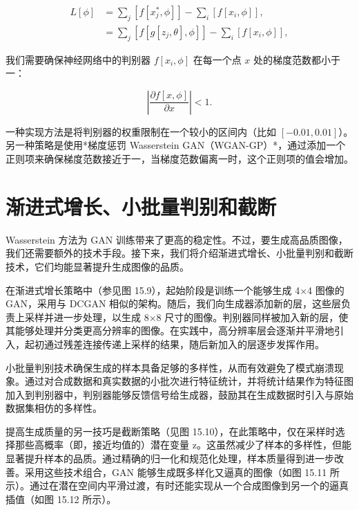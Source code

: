 \begin{align}
L[\phi] &= \sum_j [f[x_j^*, \phi]] - \sum_i [f[x_i, \phi]], \\
&= \sum_j [f[g[z_j, \theta], \phi]] - \sum_i [f[x_i, \phi]], 
\end{align} 


我们需要确保神经网络中的判别器 \(f[x_i, \phi]\) 在每一个点 \(x\) 处的梯度范数都小于一：

\begin{equation}
\left| \frac{\partial f[x, \phi]}{\partial x} \right| < 1. 
\end{equation}

一种实现方法是将判别器的权重限制在一个较小的区间内（比如 \([-0.01, 0.01]\)）。另一种策略是使用*梯度惩罚 Wasserstein GAN（WGAN-GP）*，通过添加一个正则项来确保梯度范数接近于一，当梯度范数偏离一时，这个正则项的值会增加。

\section{渐进式增长、小批量判别和截断}
Wasserstein 方法为 GAN 训练带来了更高的稳定性。不过，要生成高品质图像，我们还需要额外的技术手段。接下来，我们将介绍渐进式增长、小批量判别和截断技术，它们均能显著提升生成图像的品质。

在渐进式增长策略中（参见图 15.9），起始阶段是训练一个能够生成 4×4 图像的 GAN，采用与 DCGAN 相似的架构。随后，我们向生成器添加新的层，这些层负责上采样并进一步处理，以生成 8×8 尺寸的图像。判别器同样被加入新的层，使其能够处理并分类更高分辨率的图像。在实践中，高分辨率层会逐渐并平滑地引入，起初通过残差连接传递上采样的结果，随后新加入的层逐步发挥作用。

小批量判别技术确保生成的样本具备足够的多样性，从而有效避免了模式崩溃现象。通过对合成数据和真实数据的小批次进行特征统计，并将统计结果作为特征图加入到判别器中，判别器能够反馈信号给生成器，鼓励其在生成数据时引入与原始数据集相仿的多样性。

提高生成质量的另一技巧是截断策略（见图 15.10），在此策略中，仅在采样时选择那些高概率（即，接近均值的）潜在变量 z。这虽然减少了样本的多样性，但能显著提升样本的品质。通过精确的归一化和规范化处理，样本质量得到进一步改善。采用这些技术组合，GAN 能够生成既多样化又逼真的图像（如图 15.11 所示）。通过在潜在空间内平滑过渡，有时还能实现从一个合成图像到另一个的逼真插值（如图 15.12 所示）。

